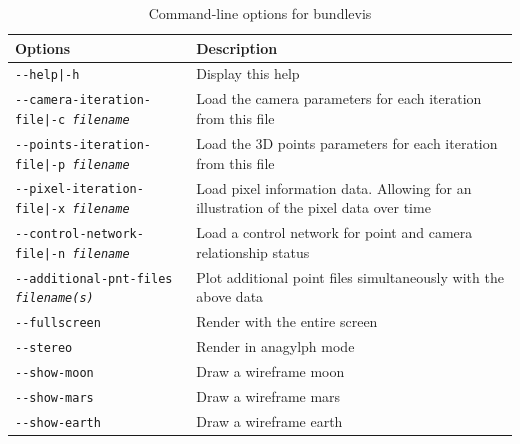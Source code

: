 \begin{longtable}{|l|p{10cm}|}
\caption{Command-line options for bundlevis}
\label{tbl:bundlevis}
\endfirsthead
\endhead
\endfoot
\endlastfoot
\hline
Options & Description \\ \hline \hline
\texttt{-\/-help|-h} & Display this help \\ \hline
\texttt{-\/-camera-iteration-file|-c \textit{filename}} & Load the camera parameters for each iteration from this file \\ \hline
\texttt{-\/-points-iteration-file|-p \textit{filename}} & Load the 3D points parameters for each iteration from this file \\ \hline
\texttt{-\/-pixel-iteration-file|-x \textit{filename}} & Load pixel information data. Allowing for an illustration of the pixel data over time \\ \hline
\texttt{-\/-control-network-file|-n \textit{filename}} & Load a control network for point and camera relationship status \\ \hline
\texttt{-\/-additional-pnt-files \textit{filename(s)}} & Plot additional point files simultaneously with the above data \\ \hline
\texttt{-\/-fullscreen} & Render with the entire screen \\ \hline
\texttt{-\/-stereo} & Render in anagylph mode \\ \hline
\texttt{-\/-show-moon} & Draw a wireframe moon \\ \hline
\texttt{-\/-show-mars} & Draw a wireframe mars \\ \hline
\texttt{-\/-show-earth} & Draw a wireframe earth \\ \hline
\end{longtable}









